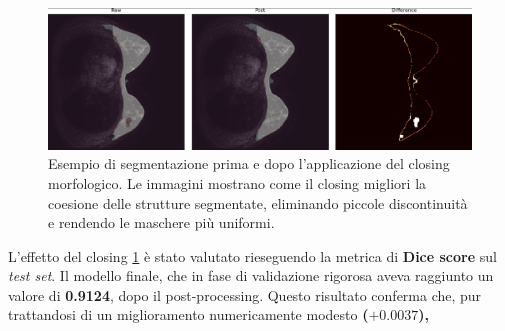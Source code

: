 \begin{figure}[H] 
  	\centering 
 	\includegraphics[width=\textwidth]{images/2025-08-08-18-52-24.png} 
    \caption{Esempio di segmentazione prima e dopo l'applicazione del closing morfologico. Le immagini mostrano come il closing migliori la coesione delle strutture segmentate, eliminando piccole discontinuità e rendendo le maschere più uniformi.}
    \label{fig:closing_example}
 \end{figure} 

L’effetto del closing \ref{fig:closing_example} è stato valutato rieseguendo la metrica di \textbf{Dice score} sul \emph{test set}. Il modello finale, che in fase di validazione rigorosa aveva raggiunto un valore di \textbf{0.9124},  dopo il post-processing. Questo risultato conferma che, pur trattandosi di un miglioramento numericamente modesto \textbf{(\(+0.0037\)),} 



